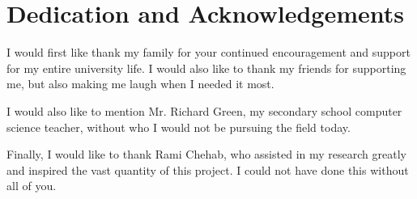 \documentclass[ oneside,%
                    author={Joshua Felmeden},
                    degree={MEng},
                     title={Sentiment Analysis of Financial Headlines Based on Stock Returns},
                  subtitle={Research}]{dissertation}
\begin{document}


\chapter*{Dedication and Acknowledgements}



I would first like thank my family for your continued encouragement and support for my entire university life. I would also like to thank my friends for supporting me, but also making me laugh when I needed it most.

I would also like to mention Mr. Richard Green, my secondary school computer science teacher, without who I would not be pursuing the field today.

Finally, I would like to thank Rami Chehab, who assisted in my research greatly and inspired the vast quantity of this project. I could not have done this without all of you.








\end{document}
